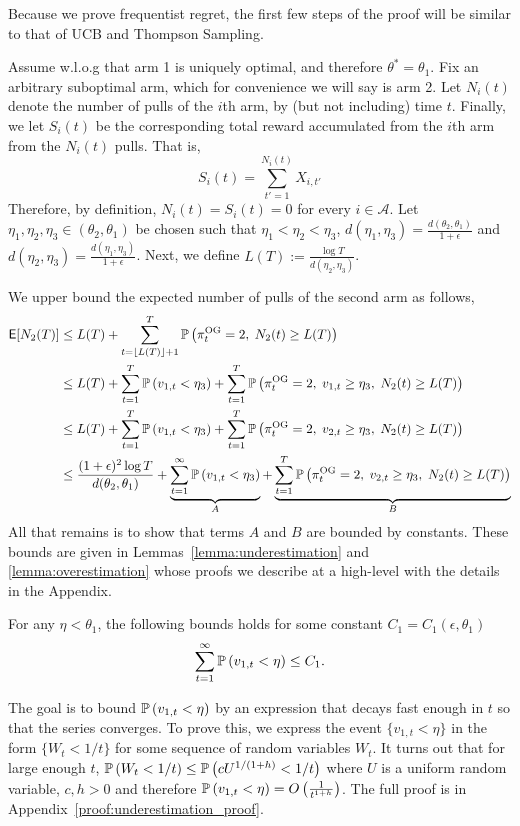 \begin{myproof}[Proof.]
	Because we prove frequentist regret, the first few steps of the proof will be similar to that of UCB and Thompson Sampling.
	
	Assume w.l.o.g that arm 1 is uniquely optimal, and therefore $\theta^* = \theta_1$. Fix an arbitrary suboptimal arm, which for convenience we will say is arm 2. Let $N_i(t)$ denote the number of pulls of the $i$th arm, by (but not including) time $t$. Finally, we let $S_i(t)$ be the corresponding total reward accumulated from the $i$th arm from the $N_i(t)$ pulls. That is,
	\[
	S_i(t) = \sum_{t'=1}^{N_i(t)} X_{i,t'}
	\]
	Therefore, by definition, $N_i(t) = S_i(t) = 0$ for every $i \in \mathcal{A}$. Let $\eta_1,\eta_2,\eta_3 \in (\theta_2, \theta_1)$ be chosen such that $\eta_1 < \eta_2 < \eta_3$, $d(\eta_1, \eta_3) = \frac{d(\theta_2, \theta_1)}{1+\epsilon}$ and $d(\eta_2,\eta_3) =\frac{d(\eta_1, \eta_3)}{1+\epsilon} $. Next, we define $L(T) := \frac{\log T}{d(\eta_2,\eta_3)}$.
	
	We upper bound the expected number of pulls of the second arm as follows,
	\begin{align}
	\E[N_2(T)] & \le L(T) + \sum_{t=\floor{L(T)}+1}^T \P{\pi^{\rm OG}_t = 2, \; N_2(t) \ge L(T)} \nonumber \\
	& \le L(T) +   \sum_{t=1}^T \P{v_{1,t} < \eta_3} + \sum_{t=1}^T \P{\pi^{\rm OG}_t = 2,\; v_{1,t} \ge \eta_3, \; N_2(t) \ge L(T)} \nonumber \\
	& \le L(T) +   \sum_{t=1}^T \P{v_{1,t} < \eta_3} + \sum_{t=1}^T \P{\pi^{\rm OG}_t = 2,\; v_{2,t} \ge \eta_3, \; N_2(t) \ge L(T)} \nonumber \\
	& \le \frac{(1+\epsilon)^2 \log T}{d(\theta_2, \theta_1)} + \underbrace{\sum_{t=1}^\infty \P{v_{1,t} < \eta_3}}_{A} + \underbrace{\sum_{t=1}^T \P{\pi^{\rm OG}_t = 2,\;v_{2,t} \ge \eta_3, \; N_2(t) \ge L(T)}}_{B} \label{bound:final_step_in_freq_regret}
	\end{align}
	All that remains is to show that terms $A$ and $B$ are bounded by constants. These bounds are given in Lemmas~\ref{lemma:underestimation} and \ref{lemma:overestimation} whose proofs we describe at a high-level with the details in the Appendix.
	\begin{lemma} \label{lemma:underestimation}
		For any $\eta < \theta_1$, the following bounds holds for some constant $C_1 = C_1(\epsilon, \theta_1)$
		\begin{equation*}
		\sum_{t=1}^\infty \P{v_{1,t} < \eta} \le C_1.
		\end{equation*}
	\end{lemma}
	\begin{myproof}
		The goal is to bound $\P{v_{1,t} < \eta}$ by an expression that decays fast enough in $t$ so that the series converges. To prove this, we express the event $\{v_{1,t} < \eta\}$ in the form $\{W_t < 1/t\}$ for some sequence of random variables $W_t$. It  turns out that for large enough $t$, $\P{W_t < 1/t} \le \P{c U^{1/(1+h)} < 1/t}$ where $U$ is a uniform random variable, $c, h > 0$ and therefore $\P{v_{1,t} < \eta} = O\left(\frac{1}{t^{1+h}}\right)$. The full proof is in Appendix~\ref{proof:underestimation_proof}.
		

\end{myproof}
\end{myproof}
